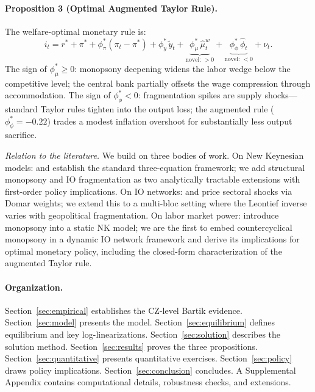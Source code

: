 \paragraph{Proposition 3 (Optimal Augmented Taylor Rule).}
The welfare-optimal monetary rule is:
\begin{equation*}
  i_t = r^* + \pi^* + \phi_\pi^*(\pi_t - \pi^*) + \phi_y^*\,\tilde{y}_t
        + \underbrace{\phi_\mu^*\,\hat\mu_t^w}_{\text{novel: }>0}
        + \underbrace{\phi_\phi^*\,\hat\phi_t}_{\text{novel: }<0} + \nu_t.
\end{equation*}
The sign of $\phi_\mu^* \geq 0$: monopsony deepening widens the labor
wedge below the competitive level; the central bank partially offsets
the wage compression through accommodation.
The sign of $\phi_\phi^* < 0$:
fragmentation spikes are supply shocks---standard Taylor rules tighten into
the output loss; the augmented rule ($\phi_\phi^* = -0.22$) trades a modest
inflation overshoot for substantially less output sacrifice.

\textit{Relation to the literature.}
We build on three bodies of work. On New Keynesian models: \citet{clarida1999}
and \citet{woodford2003} establish the standard three-equation framework;
we add structural monopsony and IO fragmentation as two analytically tractable
extensions with first-order policy implications. On IO networks:
\citet{baqaee2019} and \citet{acemoglu2012} price sectoral shocks via Domar
weights; we extend this to a multi-bloc setting where the Leontief inverse
varies with geopolitical fragmentation. On labor market power:
\citet{berger2022monopsony} introduce monopsony into a static NK model;
we are the first to embed countercyclical monopsony in a dynamic IO network
framework and derive its implications for optimal monetary policy, including
the closed-form characterization of the augmented Taylor rule.

\paragraph{Organization.}

Section~\ref{sec:empirical} establishes the CZ-level Bartik evidence.
Section~\ref{sec:model} presents the model.
Section~\ref{sec:equilibrium} defines equilibrium and key log-linearizations.
Section~\ref{sec:solution} describes the solution method.
Section~\ref{sec:results} proves the three propositions.
Section~\ref{sec:quantitative} presents quantitative exercises.
Section~\ref{sec:policy} draws policy implications.
Section~\ref{sec:conclusion} concludes. A Supplemental Appendix contains
computational details, robustness checks, and extensions.

